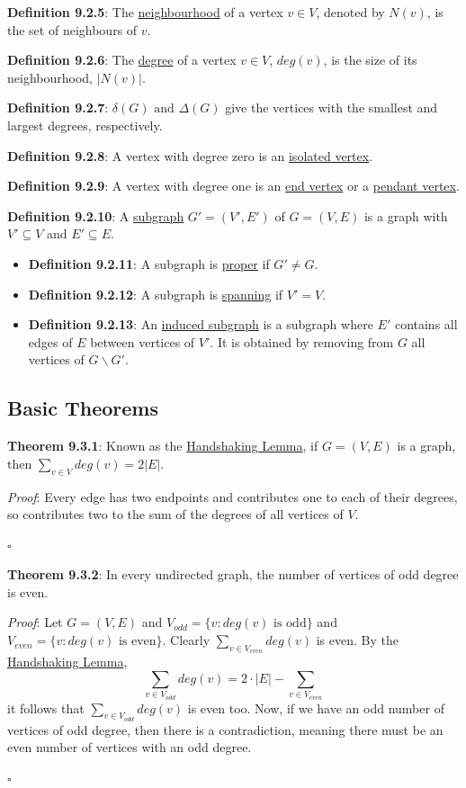 \documentclass{article}
\newcommand{\separate}[1] {\vspace{#1 pt}\noindent}
\newcommand{\definition}[2]{\textbf{Definition #1}: #2\label{def:#1}}
\newcommand{\proof}[2]{\textit{Proof}: #2 \begin{flushright}\(\square\)\end{flushright}\label{prf:#1}}
\newcommand{\theorem}[3]{\textbf{Theorem #1}: #2 \par\separate{3}\proof{thm:#1}{#3}\label{thm:#1}}
\begin{document}
\separate{7}\definition{9.2.5}{The \underline{neighbourhood} of a vertex \(v \in V\), denoted by \(N(v)\), is the set of neighbours of \(v\).}

\separate{7}\definition{9.2.6}{The \underline{degree} of a vertex \(v \in V\), \(deg(v)\), is the size of its neighbourhood, \(|N(v)|\).}

\separate{7}\definition{9.2.7}{\underline{\(\delta(G) \text{ and } \Delta(G)\)} give the vertices with the smallest and largest degrees, respectively.}

\separate{7}\definition{9.2.8}{A vertex with degree zero is an \underline{isolated vertex}.}

\separate{7}\definition{9.2.9}{A vertex with degree one is an \underline{end vertex} or a \underline{pendant vertex}.}

\separate{7}\definition{9.2.10}{A \underline{subgraph} \(G'=(V',E')\) of \(G=(V,E)\) is a graph with \(V' \subseteq V\) and \(E' \subseteq E\).}
\begin{itemize}
    \item \definition{9.2.11}{A subgraph is \underline{proper} if \(G'\neq G\).}
    \item \definition{9.2.12}{A subgraph is \underline{spanning} if \(V' = V\).}
    \item \definition{9.2.13}{An \underline{induced subgraph} is a subgraph where \(E'\) contains all edges of \(E\) between vertices of \(V'\). It is obtained by removing from \(G\) all vertices of \(G \backslash G'\).}
\end{itemize}

\subsection{Basic Theorems}

\separate{7}\theorem{9.3.1}{Known as the \underline{Handshaking Lemma}, if \(G=(V,E)\) is a graph, then \(\sum_{v\in V} deg(v) = 2|E|\).}
{Every edge has two endpoints and contributes one to each of their degrees, so contributes two to the sum of the degrees of all vertices of \(V\).}

\separate{7}\theorem{9.3.2}{In every undirected graph, the number of vertices of odd degree is even.}
{Let \(G=(V,E)\) and \(V_{odd} = \{v:deg(v) \text{ is odd}\}\) and \(V_{even} = \{v:deg(v) \text{ is even}\}\). Clearly \(\sum_{v\in V_{even}} deg(v)\) is even. By the \hyperref[thm:9.3.1]{Handshaking Lemma},
\begin{equation}
    \sum_{v \in V_{odd}} deg(v) = 2 \cdot |E| - \sum_{v \in V_{even}}
\end{equation}
it follows that \(\sum_{v \in V_{odd}} deg(v)\) is even too. Now, if we have an odd number of vertices of odd degree, then there is a contradiction, meaning there must be an even number of vertices with an odd degree.} 
\end{document}
